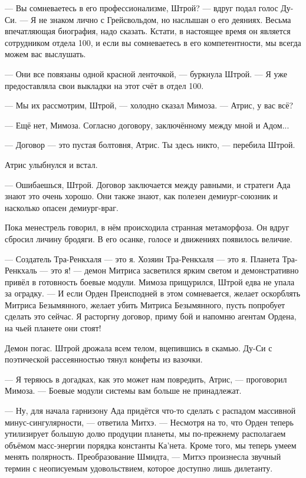 --- Вы сомневаетесь в его профессионализме, Штрой? --- вдруг подал голос Ду-Си.
--- Я не знаком лично с Грейсвольдом, но наслышан о его деяниях.
Весьма впечатляющая биография, надо сказать.
Кстати, в настоящее время он является сотрудником отдела 100, и если вы сомневаетесь в его компетентности, мы всегда можем вас выслушать.

--- Они все повязаны одной красной ленточкой, --- буркнула Штрой.
--- Я уже предоставляла свои выкладки на этот счёт в отдел 100.

--- Мы их рассмотрим, Штрой, --- холодно сказал Мимоза.
--- Атрис, у вас всё?

--- Ещё нет, Мимоза.
Согласно договору, заключённому между мной и Адом...

--- Договор --- это пустая болтовня, Атрис.
Ты здесь никто, --- перебила Штрой.

Атрис улыбнулся и встал.

--- Ошибаешься, Штрой.
Договор заключается между равными, и стратеги Ада знают это очень хорошо.
Они также знают, как полезен демиург-союзник и насколько опасен демиург-враг.

Пока менестрель говорил, в нём происходила странная метаморфоза.
Он вдруг сбросил личину бродяги.
В его осанке, голосе и движениях появилось величие.

--- Создатель Тра-Ренкхаля --- это я.
Хозяин Тра-Ренкхаля --- это я.
Планета Тра-Ренкхаль --- это я! --- демон Митриса засветился ярким светом и демонстративно привёл в готовность боевые модули.
Мимоза прищурился, Штрой едва не упала за оградку.
--- И если Орден Преисподней в этом сомневается, желает оскорблять Митриса Безымянного, желает убить Митриса Безымянного, пусть попробует сделать это сейчас.
Я расторгну договор, приму бой и напомню агентам Ордена, на чьей планете они стоят!

Демон погас.
Штрой дрожала всем телом, вцепившись в скамью.
Ду-Си с поэтической рассеянностью тянул конфеты из вазочки.

--- Я теряюсь в догадках, как это может нам повредить, Атрис, --- проговорил Мимоза.
--- Боевые модули системы вам больше не принадлежат.

--- Ну, для начала гарнизону Ада придётся что-то сделать с распадом массивной минус-сингулярности, --- ответила Митхэ.
--- Несмотря на то, что Орден теперь утилизирует большую долю продуции планеты, мы по-прежнему располагаем объёмом масс-энергии порядка константы Ка'нета.
Кроме того, мы теперь умеем менять полярность.
Преобразование Шмидта, --- Митхэ произнесла звучный термин с неописуемым удовольствием, которое доступно лишь дилетанту.

